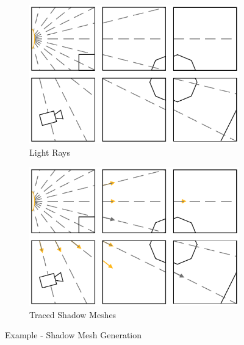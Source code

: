 \begin{figure}[!htb]
\centering
\begin{subfigure}{0.49\textwidth}
 \centering
  \includegraphics[width=.98\columnwidth]{drawings/examples/Lights1.pdf}
  \caption{Light Rays}
\end{subfigure}
\begin{subfigure}{0.49\textwidth}
 \centering
  \includegraphics[width=.98\columnwidth]{drawings/examples/Lights2.pdf}
  \caption{Traced Shadow Meshes}
\end{subfigure}
\caption{Example - Shadow Mesh Generation}
\label{fig:light-distribution}
\end{figure}

